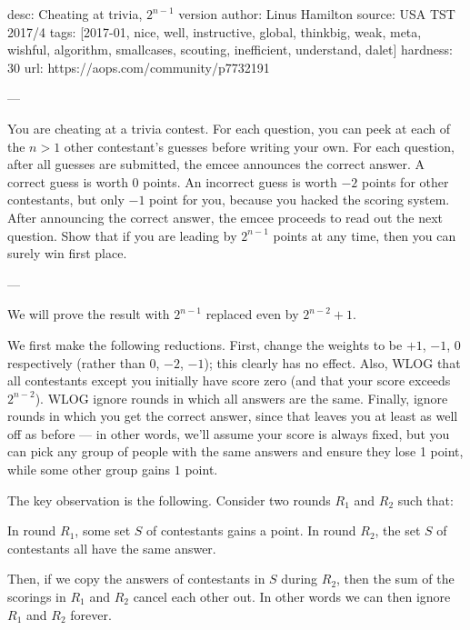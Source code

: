 desc: Cheating at trivia, $2^{n-1}$ version
author: Linus Hamilton
source: USA TST 2017/4
tags: [2017-01, nice, well, instructive, global, thinkbig, weak, meta, wishful, algorithm,
  smallcases, scouting, inefficient, understand, dalet]
hardness: 30
url: https://aops.com/community/p7732191

---

You are cheating at a trivia contest.
For each question, you can peek at each of the
$n > 1$ other contestant's guesses before writing your own.
For each question, after all guesses are submitted, the emcee announces the correct answer.
A correct guess is worth $0$ points.
An incorrect guess is worth $-2$ points for other contestants,
but only $-1$ point for you, because you hacked the scoring system.
After announcing the correct answer, the emcee proceeds to read out the next question.
Show that if you are leading by $2^{n-1}$ points at any time,
then you can surely win first place.

---

We will prove the result with $2^{n-1}$ replaced
even by $2^{n-2}+1$.

We first make the following reductions.
First, change the weights to be $+1$, $-1$, $0$ respectively
(rather than $0$, $-2$, $-1$); this clearly has no effect.
Also, WLOG that all contestants except you initially have score zero
(and that your score exceeds $2^{n-2}$).
WLOG ignore rounds in which all answers are the same.
Finally, ignore rounds in which you get the correct answer,
since that leaves you at least as well off as before --- in other words,
we'll assume your score is always fixed,
but you can pick any group of people with the same answers
and ensure they lose 1 point,
while some other group gains $1$ point.

The key observation is the following.
Consider two rounds $R_1$ and $R_2$ such that:
\begin{itemize}
  \ii In round $R_1$, some set $S$ of contestants gains a point.
  \ii In round $R_2$, the set $S$ of contestants all have the same answer.
\end{itemize}
Then, if we copy the answers of contestants in $S$ during $R_2$,
then the sum of the scorings in $R_1$ and $R_2$ cancel each other out.
In other words we can then ignore $R_1$ and $R_2$ forever.

